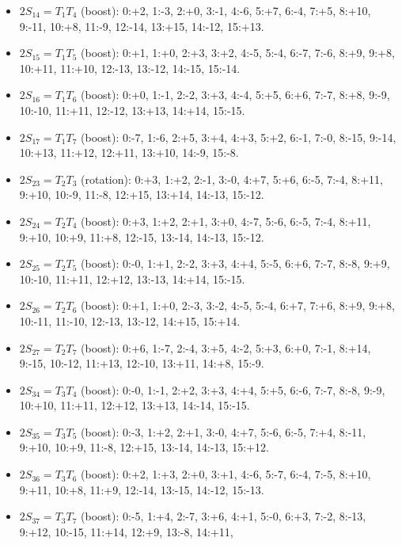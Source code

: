 \documentclass[
  10pt,
]{article}
\begin{document}
\begin{itemize}
  \(2S_{13} = T_1T_3\) (rotation): 0:+2, 1:-3, 2:-0, 3:+1, 4:+6, 5:-7,
  6:-4, 7:+5, 8:+10, 9:-11, 10:-8, 11:+9, 12:+14, 13:-15, 14:-12,
  15:+13.
\item
  \(2S_{14} = T_1T_4\) (boost): 0:+2, 1:-3, 2:+0, 3:-1, 4:-6, 5:+7,
  6:-4, 7:+5, 8:+10, 9:-11, 10:+8, 11:-9, 12:-14, 13:+15, 14:-12,
  15:+13.
\item
  \(2S_{15} = T_1T_5\) (boost): 0:+1, 1:+0, 2:+3, 3:+2, 4:-5, 5:-4,
  6:-7, 7:-6, 8:+9, 9:+8, 10:+11, 11:+10, 12:-13, 13:-12, 14:-15,
  15:-14.
\item
  \(2S_{16} = T_1T_6\) (boost): 0:+0, 1:-1, 2:-2, 3:+3, 4:-4, 5:+5,
  6:+6, 7:-7, 8:+8, 9:-9, 10:-10, 11:+11, 12:-12, 13:+13, 14:+14,
  15:-15.
\item
  \(2S_{17} = T_1T_7\) (boost): 0:-7, 1:-6, 2:+5, 3:+4, 4:+3, 5:+2,
  6:-1, 7:-0, 8:-15, 9:-14, 10:+13, 11:+12, 12:+11, 13:+10, 14:-9,
  15:-8.
\item
  \(2S_{23} = T_2T_3\) (rotation): 0:+3, 1:+2, 2:-1, 3:-0, 4:+7, 5:+6,
  6:-5, 7:-4, 8:+11, 9:+10, 10:-9, 11:-8, 12:+15, 13:+14, 14:-13,
  15:-12.
\item
  \(2S_{24} = T_2T_4\) (boost): 0:+3, 1:+2, 2:+1, 3:+0, 4:-7, 5:-6,
  6:-5, 7:-4, 8:+11, 9:+10, 10:+9, 11:+8, 12:-15, 13:-14, 14:-13,
  15:-12.
\item
  \(2S_{25} = T_2T_5\) (boost): 0:-0, 1:+1, 2:-2, 3:+3, 4:+4, 5:-5,
  6:+6, 7:-7, 8:-8, 9:+9, 10:-10, 11:+11, 12:+12, 13:-13, 14:+14,
  15:-15.
\item
  \(2S_{26} = T_2T_6\) (boost): 0:+1, 1:+0, 2:-3, 3:-2, 4:-5, 5:-4,
  6:+7, 7:+6, 8:+9, 9:+8, 10:-11, 11:-10, 12:-13, 13:-12, 14:+15,
  15:+14.
\item
  \(2S_{27} = T_2T_7\) (boost): 0:+6, 1:-7, 2:-4, 3:+5, 4:-2, 5:+3,
  6:+0, 7:-1, 8:+14, 9:-15, 10:-12, 11:+13, 12:-10, 13:+11, 14:+8,
  15:-9.
\item
  \(2S_{34} = T_3T_4\) (boost): 0:-0, 1:-1, 2:+2, 3:+3, 4:+4, 5:+5,
  6:-6, 7:-7, 8:-8, 9:-9, 10:+10, 11:+11, 12:+12, 13:+13, 14:-14,
  15:-15.
\item
  \(2S_{35} = T_3T_5\) (boost): 0:-3, 1:+2, 2:+1, 3:-0, 4:+7, 5:-6,
  6:-5, 7:+4, 8:-11, 9:+10, 10:+9, 11:-8, 12:+15, 13:-14, 14:-13,
  15:+12.
\item
  \(2S_{36} = T_3T_6\) (boost): 0:+2, 1:+3, 2:+0, 3:+1, 4:-6, 5:-7,
  6:-4, 7:-5, 8:+10, 9:+11, 10:+8, 11:+9, 12:-14, 13:-15, 14:-12,
  15:-13.
\item
  \(2S_{37} = T_3T_7\) (boost): 0:-5, 1:+4, 2:-7, 3:+6, 4:+1, 5:-0,
  6:+3, 7:-2, 8:-13, 9:+12, 10:-15, 11:+14, 12:+9, 13:-8, 14:+11,

\end{itemize}
\end{document}

